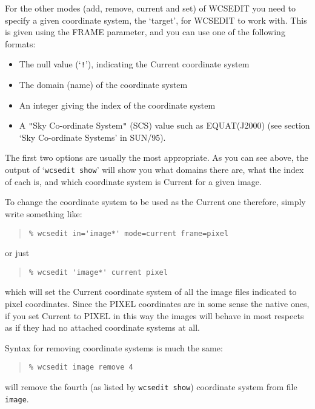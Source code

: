 \documentclass[twoside,11pt]{article}
\newcommand{\xref}[3]{#1}
\renewcommand{\_}{\texttt{\symbol{95}}}
\newenvironment{myquote}{\begin{quote}\begin{small}}{\end{small}\end{quote}}
\newcommand{\qt}[1]{{\tt "}#1{\tt "}}
\newcommand{\routine}[1]{{\sc #1}}
\begin{document}
For the other modes (add, remove, current and set) of \routine{WCSEDIT}
you need to specify a given coordinate system,
the `target', for \routine{WCSEDIT} to work with.
This is given using the FRAME parameter, and you can use one
of the following formats:
\begin{itemize}
\item
The null value (`{\tt !}'), indicating the Current coordinate system
\item
The domain (name) of the coordinate system
\item
An integer giving the index of the coordinate system
\item
A \qt{Sky Co-ordinate System} (SCS) value such as EQUAT(J2000)
(see section \xref{`Sky Co-ordinate Systems'}{sun95}{se_scs} in 
\xref{SUN/95}{sun95}{}).
\end{itemize}
The first two options are usually the most appropriate.
As you can see above, the output of `{\tt wcsedit show}' 
will show you what domains there are, what the index of each is, 
and which coordinate system is Current for a given image.

To change the coordinate system to be used as the Current one
therefore, simply write something like:
\begin{myquote}
\begin{verbatim}
% wcsedit in='image*' mode=current frame=pixel
\end{verbatim}
\end{myquote}
or just
\begin{myquote}
\begin{verbatim}
% wcsedit 'image*' current pixel
\end{verbatim}
\end{myquote}
which will set the Current coordinate system of all the image files
indicated to pixel coordinates.
Since the PIXEL coordinates are in some sense the native ones,
if you set Current to PIXEL in this way
the images will behave in most respects as if they had no attached
coordinate systems at all.

Syntax for removing coordinate systems is much the same:
\begin{myquote}
\begin{verbatim}
% wcsedit image remove 4
\end{verbatim}
\end{myquote}
will remove the fourth (as listed by {\tt wcsedit show}) coordinate
system from file {\tt image}.
\end{document}
